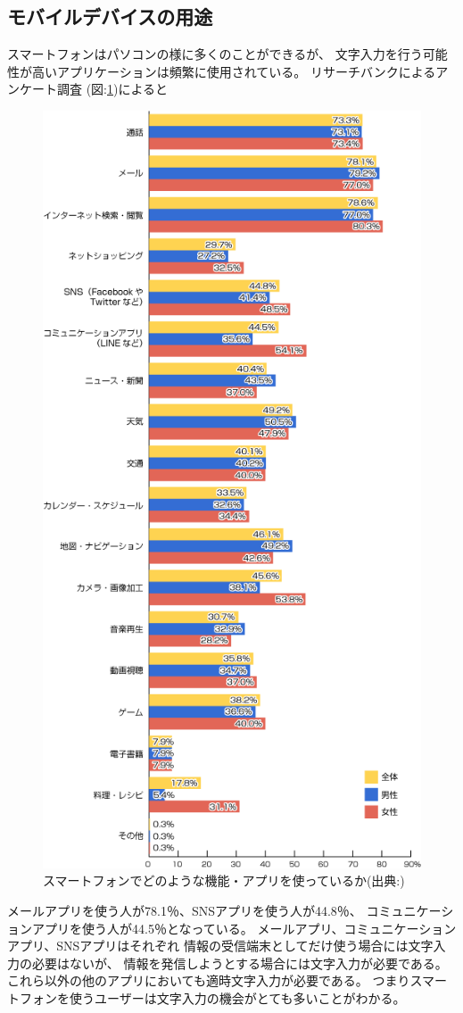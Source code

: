 \subsection{モバイルデバイスの用途}
スマートフォンはパソコンの様に多くのことができるが、
文字入力を行う可能性が高いアプリケーションは頻繁に使用されている。
リサーチバンクによるアンケート調査\cite{researchbanksmartphone}
(図:\ref{fig:purpose})によると
\begin{figure}[htbp]
  \begin{center}
    \includegraphics[width=115mm,bb=0 0 500 1001]{images/purpose.png}
    \caption{スマートフォンでどのような機能・アプリを使っているか(出典:\cite{researchbanksmartphone})}
    \label{fig:purpose}
  \end{center}
\end{figure}
メールアプリを使う人が78.1％、SNSアプリを使う人が44.8％、
コミュニケーションアプリを使う人が44.5％となっている。
メールアプリ、コミュニケーションアプリ、SNSアプリはそれぞれ
情報の受信端末としてだけ使う場合には文字入力の必要はないが、
情報を発信しようとする場合には文字入力が必要である。
これら以外の他のアプリにおいても適時文字入力が必要である。
つまりスマートフォンを使うユーザーは文字入力の機会がとても多いことがわかる。

